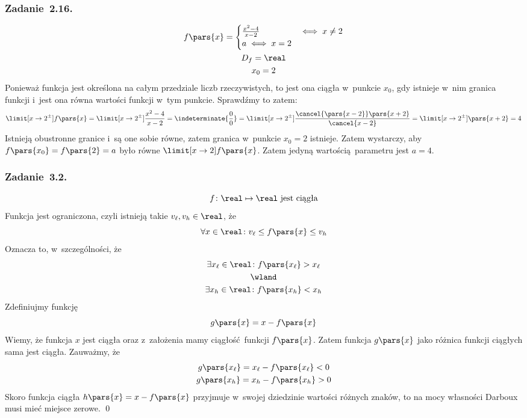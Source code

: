 \subsubsection*{Zadanie~2.16.}
\begin{gather*}
    f\pars{x} = \begin{cases}
        \frac{x^2 - 4}{x - 2} & \iff x \neq 2\\
        a \iff x = 2
    \end{cases}\\
    D_f = \real\\
    x_0 = 2
\end{gather*}
Ponieważ funkcja jest określona na całym przedziale liczb rzeczywistych, to jest ona ciągła w~punkcie \(x_0\), gdy istnieje w~nim granica funkcji i~jest ona równa wartości funkcji w~tym punkcie. Sprawdźmy to zatem:
\begin{equation*}
    \limit[x \to 2^\pm] f\pars{x}
        = \limit[x \to 2^\pm] \frac{x^2 - 4}{x - 2}
        = \indeterminate{\frac{0}{0}}
        = \limit[x \to 2^\pm] \frac{\cancel{\pars{x - 2}}\pars{x + 2}}{\cancel{x - 2}}
        = \limit[x \to 2^\pm] \pars{x + 2}
        = 4
\end{equation*}
Istnieją obustronne granice i~są one sobie równe, zatem granica w~punkcie \(x_0 = 2\) istnieje. Zatem wystarczy, aby \(f\pars{x_0} = f\pars{2} = a\) było równe \(\limit[x \to 2] f\pars{x}\). Zatem jedyną wartością parametru jest \(a = 4\).
\subsubsection*{Zadanie~3.2.}
\begin{equation*}
    f\colon \real \mapsto \real \text{ jest ciągła}
\end{equation*}
Funkcja jest ograniczona, czyli istnieją takie \(v_\ell, v_h \in \real\), że
\begin{equation*}
    \forall x \in \real\colon v_\ell \leq f\pars{x} \leq v_h
\end{equation*}
Oznacza to, w~szczególności, że
\begin{gather*}
    \exists x_\ell \in \real\colon f\pars{x_\ell} > x_\ell\\
    \wland\\
    \exists x_h \in \real\colon f\pars{x_h} < x_h
\end{gather*}
Zdefiniujmy funkcję
\begin{equation*}
    g\pars{x} = x - f\pars{x}
\end{equation*}
Wiemy, że funkcja \(x\) jest ciągła oraz z~założenia mamy ciągłość funkcji \(f\pars{x}\). Zatem funkcja \(g\pars{x}\) jako różnica funkcji ciągłych sama jest ciągła. Zauważmy, że
\begin{gather*}
    g\pars{x_\ell} = x_\ell - f\pars{x_\ell} < 0\\
    g\pars{x_h} = x_h - f\pars{x_h} > 0
\end{gather*}
Skoro funkcja ciągła \(h\pars{x} = x - f\pars{x}\) przyjmuje w~swojej dziedzinie wartości różnych znaków, to na mocy własności Darboux musi mieć miejsce zerowe.
\qed

